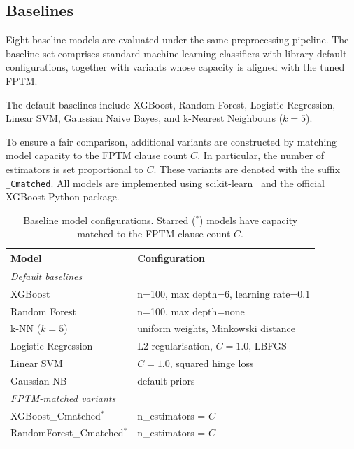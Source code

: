 \documentclass[journal,twoside,web]{ieeecolor}
\begin{document}
\subsection{Baselines}
\label{sec:baselines}

Eight baseline models are evaluated under the same preprocessing
pipeline. The baseline set comprises standard machine learning
classifiers with library-default configurations, together with
variants whose capacity is aligned with the tuned FPTM.

The default baselines include XGBoost, Random Forest, Logistic
Regression, Linear SVM, Gaussian Naive Bayes, and k-Nearest Neighbours
($k=5$).

To ensure a fair comparison, additional variants are constructed by
matching model capacity to the FPTM clause count $C$. In particular,
the number of estimators is set proportional to $C$.
These variants are denoted with the suffix \texttt{\_Cmatched}. All
models are implemented using scikit-learn~\cite{pedregosa2011scikit}
and the official XGBoost Python package.
\begin{table}[t]
\centering
\caption{Baseline model configurations. Starred ($^\ast$) models have
capacity matched to the FPTM clause count $C$.}
\label{tab:model_configs}
\renewcommand{\arraystretch}{1.2}
\begin{tabular}{|l|l|}
\hline
\textbf{Model} & \textbf{Configuration} \\
\hline
\multicolumn{2}{|l|}{\textit{Default baselines}} \\
\hline
XGBoost            & n=100, max depth=6, learning rate=0.1 \\
\hline
Random Forest      & n=100, max depth=none \\
\hline
k-NN ($k=5$)       & uniform weights, Minkowski distance \\
\hline
Logistic Regression & L2 regularisation, $C=1.0$, LBFGS \\
\hline
Linear SVM         & $C=1.0$, squared hinge loss \\
\hline
Gaussian NB        & default priors \\
\hline
\multicolumn{2}{|l|}{\textit{FPTM-matched variants}} \\
\hline
XGBoost\_Cmatched$^\ast$      & n\_estimators = $C$ \\
\hline
RandomForest\_Cmatched$^\ast$ & n\_estimators = $C$ \\
\hline
\end{tabular}
\end{table}
\end{document}

